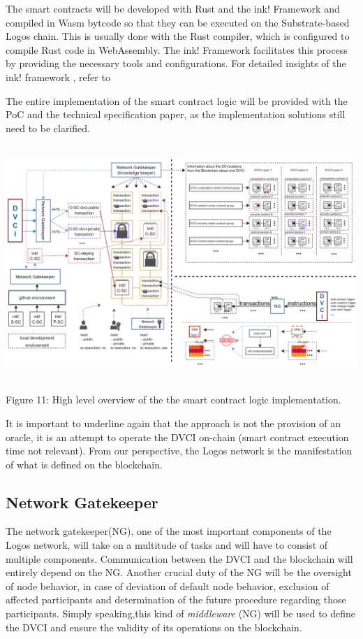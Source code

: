 \documentclass[]{article}
\begin{document}
The smart contracts will be developed with Rust \cite{rust-book} and the ink! Framework and compiled in Wasm bytcode so that they can be executed on the Substrate-based Logos chain. 
This is usually done with the Rust compiler, which is configured to compile Rust code in WebAssembly. 
The ink! Framework facilitates this process by providing the necessary tools and configurations.
For detailed insights of the ink! framework , refer to \cite{ink!articl}

The entire implementation of the smart contract logic will be provided with the PoC and the technical specification paper, as the implementation solutions still need to be clarified.   

\begin{center}
	\includegraphics[height=8.9cm]{smart-contract-logic}
\end{center}
\begin{center}
	Figure 11: High level overview of the the smart contract logic implementation.
\end{center}

It is important to underline again that the approach is not the provision of an oracle, it is an attempt to operate the DVCI on-chain (smart contract execution time not relevant). 
From our perspective, the Logos network is the manifestation of what is defined on the blockchain.

\subsection{Network Gatekeeper}
The network gatekeeper(NG), one of the most important components of the Logos network, will take on a multitude of tasks and will have to consist of multiple components. 
Communication between the DVCI and the blockchain will entirely depend on the NG. 
Another crucial duty of the NG will be the oversight of node behavior, in case of deviation of default node behavior, exclusion of affected participants and determination of the future procedure regarding those participants.
Simply speaking,this kind of \textit{middleware} (NG) will be used to define the DVCI and ensure the validity of its operations on the blockchain.  
\end{document}
